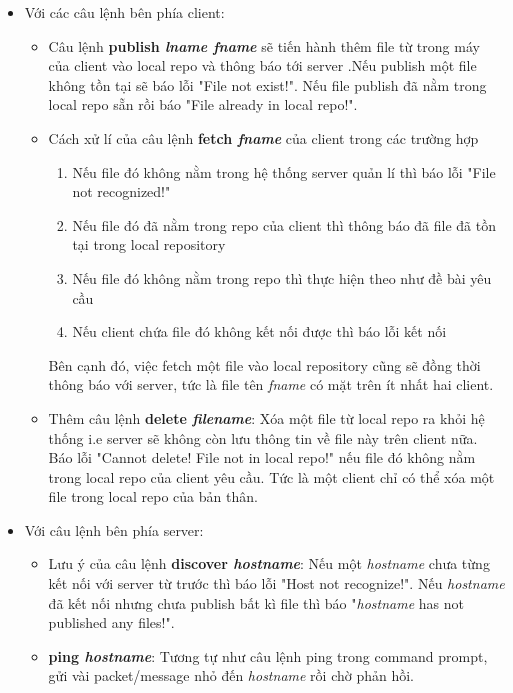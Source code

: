 \documentclass[a4paper]{article}
\begin{document}
	\begin{itemize}
		\item Với các câu lệnh bên phía client:
		\begin{itemize}
			\item Câu lệnh \textbf{publish \textit{lname fname}} sẽ tiến hành thêm file từ trong máy của client vào local repo và thông báo tới server .Nếu publish một file không tồn tại sẽ báo lỗi "File not exist!". Nếu file publish đã nằm trong local repo sẵn rồi báo "File already in local repo!".
			\item Cách xử lí của câu lệnh \textbf{fetch \textit{fname}} của client trong các trường hợp
			\begin{enumerate}
				\item Nếu file đó không nằm trong hệ thống server quản lí thì báo lỗi "File not recognized!"
				\item Nếu file đó đã nằm trong repo của client thì thông báo đã file đã tồn tại trong local repository
				\item Nếu file đó không nằm trong repo thì thực hiện theo như đề bài yêu cầu
				\item Nếu client chứa file đó không kết nối được thì báo lỗi kết nối 
			\end{enumerate}
			Bên cạnh đó, việc fetch một file vào local repository cũng sẽ đồng thời thông báo với server, tức là file tên \textit{fname} có mặt trên ít nhất hai client.
			\item Thêm câu lệnh \textbf{delete \textit{filename}}: Xóa một file từ local repo ra khỏi hệ thống i.e server sẽ không còn lưu thông tin về file này trên client nữa.
			Báo lỗi "Cannot delete! File not in local repo!" nếu file đó không nằm trong local repo của client yêu cầu. Tức là một client chỉ có thể xóa một file trong local repo của bản thân.
		\end{itemize}
		\item Với câu lệnh bên phía server:
		\begin{itemize}
			\item Lưu ý của câu lệnh \textbf{discover \textit{hostname}}: Nếu một \textit{hostname} chưa từng kết nối với server từ trước thì báo lỗi "Host not recognize!". Nếu \textit{hostname} đã kết nối nhưng chưa publish bất kì file thì báo "\textit{hostname} has not published any files!".
			\item \textbf{ping \textit{hostname}}: Tương tự như câu lệnh ping trong command prompt, gửi vài packet/message nhỏ đến \textit{hostname} rồi chờ phản hồi.
		\end{itemize}

\end{itemize}
\end{document}
